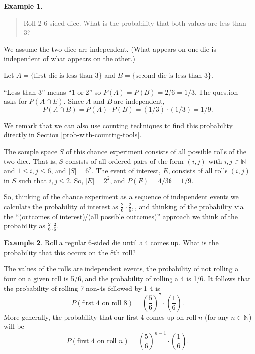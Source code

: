 \documentclass[
]{book}
\theoremstyle{definition}
\theoremstyle{definition}
\newtheorem{example}{Example}[chapter]
\theoremstyle{definition}
\theoremstyle{definition}
\theoremstyle{remark}
\begin{document}
\begin{example}
\leavevmode

\begin{quote}
Roll 2 6-sided dice. What is the probability that both values are less than 3?
\end{quote}

We assume the two dice are independent. (What appears on one die is independent of what appears on the other.)

Let \(A = \{ \text{first die is less than 3}\}\) and \(B = \{ \text{second die is less than 3}\}.\)

``Less than 3'' means ``1 or 2'' so \(P(A) = P(B) = 2/6 = 1/3.\)
The question asks for \(P(A \cap B).\) Since \(A\) and \(B\) are independent, \[P(A \cap B) = P(A)\cdot P(B) = (1/3)\cdot(1/3) = 1/9.\]

We remark that we can also use counting techniques to find this probability directly in Section \ref{prob-with-counting-tools}.

The sample space \(S\) of this chance experiment consists of all possible rolls of the two dice. That is, \(S\) consists of all ordered pairs of the form \((i,j)\) with \(i, j \in \mathbb{N}\) and \(1\leq i, j \leq 6\), and \(|S| = 6^2\). The event of interest, \(E\), consists of all rolls \((i,j)\) in \(S\) such that \(i, j \leq 2\). So, \(|E| = 2^2\), and \(P(E) = 4/36 = 1/9\).

So, thinking of the chance experiment as a sequence of independent events we calculate the probability of interest as \(\frac{2}{6} \cdot \frac{2}{6},\), and thinking of the probability via the ``(outcomes of interest)/(all possible outcomes)'' approach we think of the probability as \(\frac{2\cdot 2}{6 \cdot 6}\).

\end{example}

\begin{example}
\protect\hypertarget{exm:four-on-rolll-8}{}\label{exm:four-on-rolll-8}Roll a regular 6-sided die until a 4 comes up. What is the probability that this occurs on the 8th roll?

The values of the rolls are independent events, the probability of not rolling a four on a given roll is 5/6, and the probability of rolling a 4 is 1/6. It follows that the probability of rolling 7 non-4s followed by 1 4 is
\[P(\text{first 4 on roll 8}) = \left(\frac{5}{6}\right)^7 \cdot \left(\frac{1}{6}\right).\]
More generally, the probability that our first 4 comes up on roll \(n\) (for any \(n \in \mathbb{N}\)) will be
\[P(\text{first 4 on roll }n) = \left(\frac{5}{6}\right)^{n-1} \cdot \left(\frac{1}{6}\right).\]
\end{example}
\end{document}

